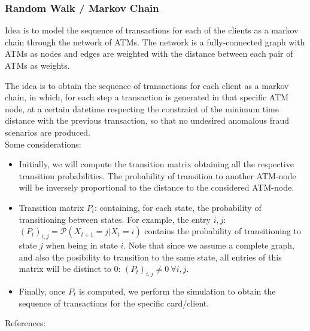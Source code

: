 \documentclass{article}
\begin{document}
\subsubsection{Random Walk / Markov Chain}

Idea is to model the sequence of transactions for each of the clients as a markov chain through the
network of ATMs. The network is a fully-connected graph with ATMs as nodes and edges are
weighted with the distance between each pair of ATMs as weights.

The idea is to obtain the sequence of transactions for each client as a markov chain, in which,
for each step a transaction is generated in that specific ATM node, at a certain datetime 
respecting the constraint of the minimum time distance with the previous transaction, so 
that no undesired anomalous fraud scenarios are produced. \\ 

Some considerations:
\begin{itemize}
  \item Initially, we will compute the transition matrix obtaining all the respective 
  transition probabilities. The probability of transition to another ATM-node will be 
  inversely proportional to the distance to the considered ATM-node.
  \item Transition matrix $P_t$: containing, for each state, the probability of transitioning
  between states. For example, the entry $i,j$: $(P_t)_{i,j} = \mathcal{P}(X_{t+1} = j | X_t = i)$
  contains the probability of transitioning to state $j$ when being in state $i$. 
  Note that since we assume a complete graph, and also the posibility to transition 
  to the same state, all entries of this matrix will be distinct to 0: $(P_t)_{i,j} \neq 0 \  
  \forall i,j$.
  \item Finally, once $P_t$ is computed, we perform the simulation to obtain the sequence of
  transactions for the specific card/client.
\end{itemize}

References:
\end{document}
